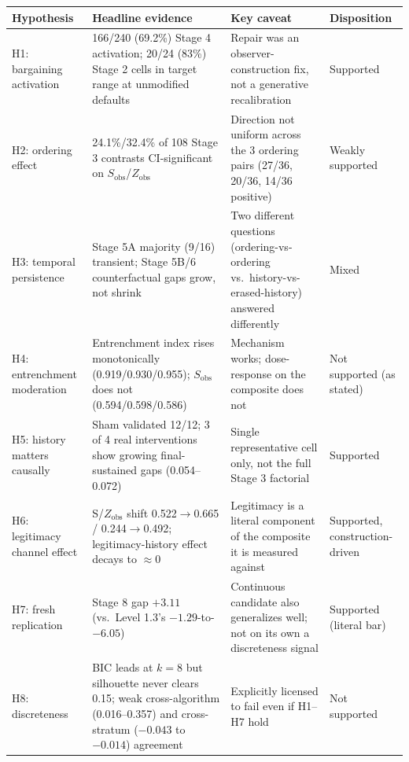 \begin{tabular}{@{}p{2.4cm}p{6.5cm}p{5.8cm}l@{}}
\toprule
\textbf{Hypothesis} & \textbf{Headline evidence} & \textbf{Key caveat} & \textbf{Disposition} \\
\midrule
H1: bargaining activation & 166/240 (69.2\%) Stage 4 activation; 20/24 (83\%) Stage 2 cells in target range at unmodified defaults & Repair was an observer-construction fix, not a generative recalibration & Supported \\
H2: ordering effect & 24.1\%/32.4\% of 108 Stage 3 contrasts CI-significant on $S_{\text{obs}}$/$Z_{\text{obs}}$ & Direction not uniform across the 3 ordering pairs (27/36, 20/36, 14/36 positive) & Weakly supported \\
H3: temporal persistence & Stage 5A majority (9/16) transient; Stage 5B/6 counterfactual gaps grow, not shrink & Two different questions (ordering-vs-ordering vs.\ history-vs-erased-history) answered differently & Mixed \\
H4: entrenchment moderation & Entrenchment index rises monotonically (0.919/0.930/0.955); $S_{\text{obs}}$ does not (0.594/0.598/0.586) & Mechanism works; dose-response on the composite does not & Not supported (as stated) \\
H5: history matters causally & Sham validated 12/12; 3 of 4 real interventions show growing final-sustained gaps (0.054--0.072) & Single representative cell only, not the full Stage 3 factorial & Supported \\
H6: legitimacy channel effect & S/$Z_{\text{obs}}$ shift 0.522$\to$0.665 / 0.244$\to$0.492; legitimacy-history effect decays to $\approx$0 & Legitimacy is a literal component of the composite it is measured against & Supported, construction-driven \\
H7: fresh replication & Stage 8 gap $+3.11$ (vs.\ Level 1.3's $-1.29$-to-$-6.05$) & Continuous candidate also generalizes well; not on its own a discreteness signal & Supported (literal bar) \\
H8: discreteness & BIC leads at $k{=}8$ but silhouette never clears 0.15; weak cross-algorithm (0.016--0.357) and cross-stratum ($-0.043$ to $-0.014$) agreement & Explicitly licensed to fail even if H1--H7 hold & Not supported \\
\bottomrule
\end{tabular}
